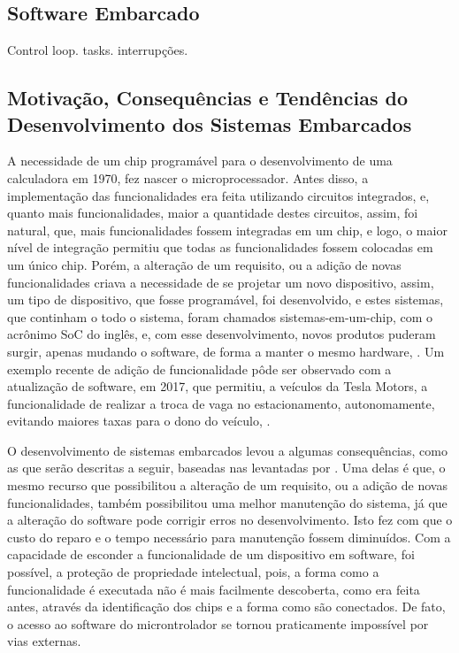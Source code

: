 \subsection{\textbf{Software Embarcado}}
\label{subsec:sub01_SoftwareEmbarcado}
Control loop. tasks. interrupções.

\subsection{\textbf{Motivação, Consequências e Tendências do Desenvolvimento dos Sistemas Embarcados}}
\label{subsec:sub01_MotivacaoConsequenciasETendencias}

A necessidade de um chip programável para o desenvolvimento de uma calculadora em 1970, fez nascer o microprocessador. Antes disso, a implementação das funcionalidades era feita utilizando circuitos integrados, e, quanto mais funcionalidades, maior a quantidade destes circuitos, assim, foi natural, que, mais funcionalidades fossem integradas em um chip, e logo, o maior nível de integração permitiu que todas as funcionalidades fossem colocadas em um único chip. Porém, a alteração de um requisito, ou a adição de novas funcionalidades criava a necessidade de se projetar um novo dispositivo, assim, um tipo de dispositivo, que fosse programável, foi desenvolvido, e estes sistemas, que continham o todo o sistema, foram chamados sistemas-em-um-chip, com o acrônimo SoC do inglês, e, com esse desenvolvimento, novos produtos puderam surgir, apenas mudando o software, de forma a manter o mesmo hardware, \cite[p.~2]{Steve2003}. Um exemplo recente de adição de funcionalidade pôde ser observado com a atualização de software, em 2017, que permitiu, a veículos da Tesla Motors, a funcionalidade de realizar a troca de vaga no estacionamento, autonomamente, evitando maiores taxas para o dono do veículo, \cite{TeslaUpdate}.

O desenvolvimento de sistemas embarcados levou a algumas consequências, como as que serão descritas a seguir, baseadas nas levantadas por . Uma delas é que, o mesmo recurso que possibilitou a alteração de um requisito, ou a adição de novas funcionalidades, também possibilitou uma melhor manutenção do sistema, já que a alteração do software pode corrigir erros no desenvolvimento. Isto fez com que o custo do reparo e o tempo necessário para manutenção fossem diminuídos.
Com a capacidade de esconder a funcionalidade de um dispositivo em software, foi possível, a proteção de propriedade intelectual, pois, a forma como a funcionalidade é executada não é mais facilmente descoberta, como era feita antes, através da identificação dos chips e a forma como são conectados. De fato, o acesso ao software do microntrolador se tornou praticamente impossível por vias externas.

